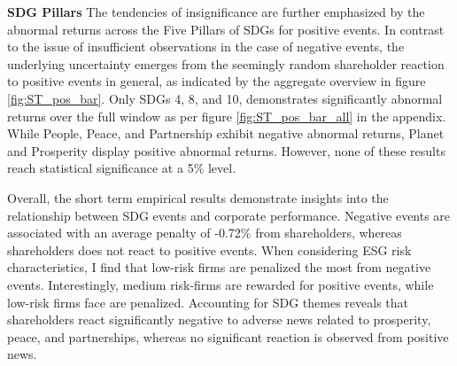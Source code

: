 \noindent \textbf{SDG Pillars}
The tendencies of insignificance are further emphasized by the abnormal returns across the Five Pillars of SDGs for positive events. In contrast to the issue of insufficient observations in the case of negative events, the underlying uncertainty emerges from the seemingly random shareholder reaction to positive events in general, as indicated by the aggregate overview in figure \ref{fig:ST_pos_bar}. 
Only SDGs 4, 8, and 10, demonstrates significantly abnormal returns over the full window as per figure \ref{fig:ST_pos_bar_all} in the appendix. While People, Peace, and Partnership exhibit negative abnormal returns, Planet and Prosperity display positive abnormal returns. However, none of these results reach statistical significance at a 5\% level.   


Overall, the short term empirical results demonstrate insights into the relationship between SDG events and corporate performance. Negative events are associated with an average penalty of -0.72\% from shareholders, whereas shareholders does not react to positive events. When considering ESG risk characteristics, I find that low-risk firms are penalized the most from negative events. Interestingly, medium risk-firms are rewarded for positive events, while low-risk firms face are penalized. Accounting for SDG themes reveals that shareholders react significantly negative to adverse news related to prosperity, peace, and partnerships, whereas no significant reaction is observed from positive news. 

